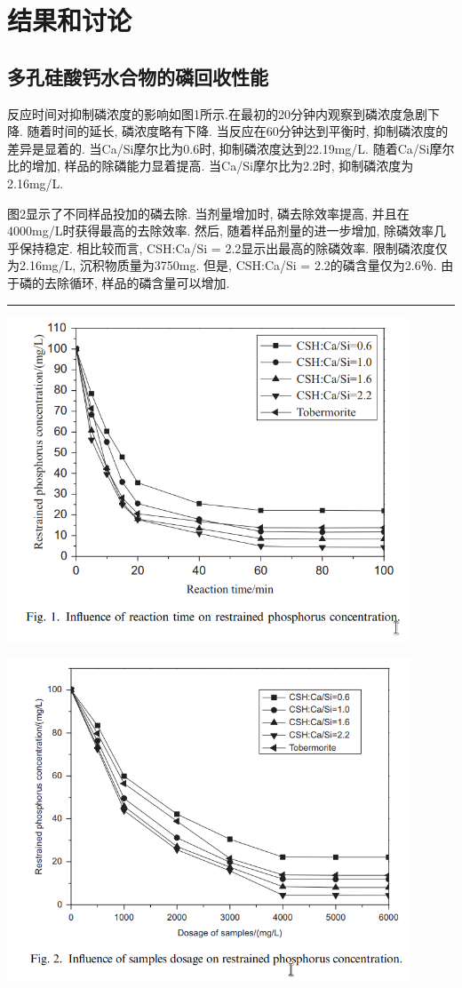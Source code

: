 \documentclass[11pt]{article}
\begin{document}
\section{结果和讨论}
\label{sec:org645f485}
\subsection{多孔硅酸钙水合物的磷回收性能}
\label{sec:orgfe42ee5}
反应时间对抑制磷浓度的影响如图1所示.在最初的20分钟内观察到磷浓度急剧下降. 随着时间的延长, 磷浓度略有下降. 当反应在60分钟达到平衡时, 抑制磷浓度的差异是显着的. 当Ca/Si摩尔比为0.6时, 抑制磷浓度达到22.19mg/L. 随着Ca/Si摩尔比的增加, 样品的除磷能力显着提高. 当Ca/Si摩尔比为2.2时, 抑制磷浓度为2.16mg/L.

图2显示了不同样品投加的磷去除. 当剂量增加时, 磷去除效率提高, 并且在4000mg/L时获得最高的去除效率. 然后, 随着样品剂量的进一步增加, 除磷效率几乎保持稳定. 相比较而言, CSH:Ca/Si = 2.2显示出最高的除磷效率. 限制磷浓度仅为2.16mg/L, 沉积物质量为3750mg. 但是, CSH:Ca/Si = 2.2的磷含量仅为2.6％. 由于磷的去除循环, 样品的磷含量可以增加.


\noindent\rule{\textwidth}{0.5pt}

\includegraphics[width=0.9\textwidth]{fig.1.png}
 \label{tab:title}

\includegraphics[width=0.9\textwidth]{fig.2.png}
 \label{tab:title}
\end{document}
